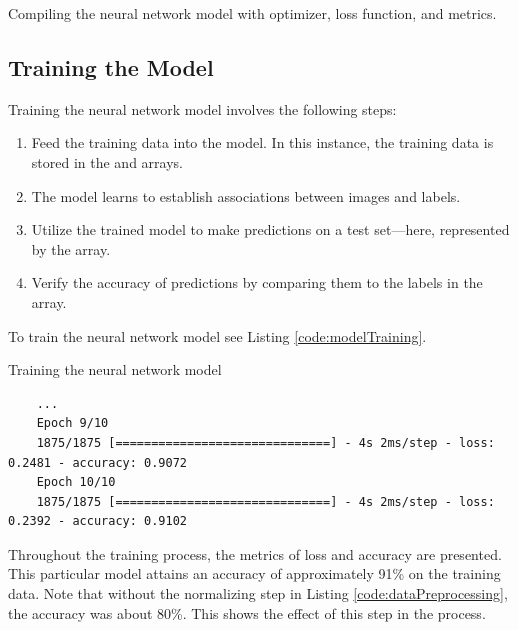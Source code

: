 \begin{code}[h!]
	    
	
	\caption{Compiling the neural network model with optimizer, loss function, and metrics.}
	\label{code:modelCompilation}
\end{code}


\subsection{Training the Model}

Training the neural network model involves the following steps:

\begin{enumerate}
	\item Feed the training data into the model. In this instance, the training data is stored in the  and  arrays.
	
	\item The model learns to establish associations between images and labels.
	
	\item Utilize the trained model to make predictions on a test set—here, represented by the  array.
	
	\item Verify the accuracy of predictions by comparing them to the labels in the  array.
\end{enumerate}

To train the neural network model see Listing \ref{code:modelTraining}.

\begin{code}[h!]
	    
	
	\caption{Training the neural network model}
	\label{code:modelTraining}
\end{code}

\begin{verbatim}
	...
	Epoch 9/10
	1875/1875 [==============================] - 4s 2ms/step - loss: 0.2481 - accuracy: 0.9072
	Epoch 10/10
	1875/1875 [==============================] - 4s 2ms/step - loss: 0.2392 - accuracy: 0.9102
\end{verbatim}

Throughout the training process, the metrics of loss and accuracy are presented. This particular model attains an accuracy of approximately 91\% on the training data. Note that without the normalizing step in Listing \ref{code:dataPreprocessing}, the accuracy was about 80\%. This shows the effect of this step in the process.

